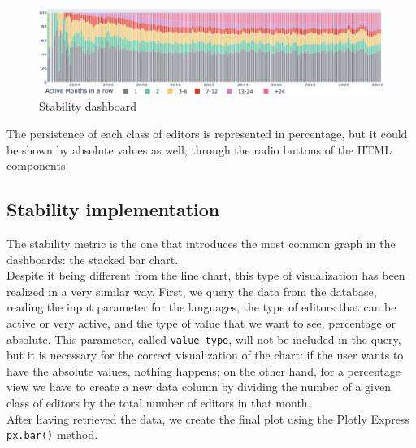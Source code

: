 \begin{figure}[h]
    \centering
    \includegraphics[width=460px]{img/stability.png}
    \caption{Stability dashboard}
    \label{fig:stability}
\end{figure}

The persistence of each class of editors is represented in percentage, but it could be shown by absolute values as well, through the radio buttons of the HTML components.\\

\subsection{Stability implementation}
\label{sec:stability_callback}
The stability metric is the one that introduces the most common graph in the dashboards: the stacked bar chart.\\
Despite it being different from the line chart, this type of visualization has been realized in a very similar way. First, we query the data from the database, reading the input parameter for the languages, the type of editors that can be active or very active, and the type of value that we want to see, percentage or absolute. This parameter, called \verb#value_type#, will not be included in the query, but it is necessary for the correct visualization of the chart: if the user wants to have the absolute values, nothing happens; on the other hand, for a percentage view we have to create a new data column by dividing the number of a given class of editors by the total number of editors in that month.\\
After having retrieved the data, we create the final plot using the Plotly Express \verb#px.bar()# method.

